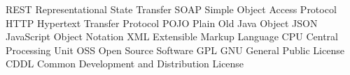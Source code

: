 	{REST}	{Representational State Transfer}
	{SOAP}	{Simple Object Access Protocol}
	{HTTP}	{Hypertext Transfer Protocol}
	{POJO}	{Plain Old Java Object}
	{JSON}	{JavaScript Object Notation}
	{XML}	{Extensible Markup Language}
	{CPU}	{Central Processing Unit}
	{OSS}	{Open Source Software}
	{GPL}	{GNU General Public License}
	{CDDL}	{Common Development and Distribution License}
